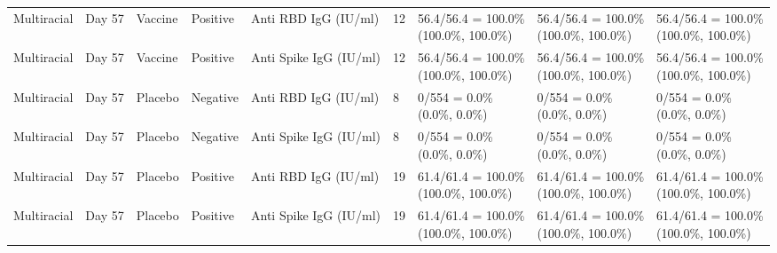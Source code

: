 \documentclass[]{book}
\theoremstyle{definition}
\theoremstyle{definition}
\theoremstyle{definition}
\newcommand{\1}{\mathbbm{1}}
\begin{document}
\begin{landscape}
\begin{ThreePartTable}
\begin{longtable}[t]{>{\raggedright\arraybackslash}p{2.7cm}llllllll}
\hspace{1em}Multiracial & Day 57 & Vaccine & Positive & Anti RBD IgG (IU/ml) & 12 & \makecell[l]{56.4/56.4 = 100.0\%\\(100.0\%, 100.0\%)} & \makecell[l]{56.4/56.4 = 100.0\%\\(100.0\%, 100.0\%)} & \makecell[l]{56.4/56.4 = 100.0\%\\(100.0\%, 100.0\%)}\\
\hspace{1em}Multiracial & Day 57 & Vaccine & Positive & Anti Spike IgG (IU/ml) & 12 & \makecell[l]{56.4/56.4 = 100.0\%\\(100.0\%, 100.0\%)} & \makecell[l]{56.4/56.4 = 100.0\%\\(100.0\%, 100.0\%)} & \makecell[l]{56.4/56.4 = 100.0\%\\(100.0\%, 100.0\%)}\\
\hspace{1em}Multiracial & Day 57 & Placebo & Negative & Anti RBD IgG (IU/ml) & 8 & \makecell[l]{0/554 = 0.0\%\\(0.0\%, 0.0\%)} & \makecell[l]{0/554 = 0.0\%\\(0.0\%, 0.0\%)} & \makecell[l]{0/554 = 0.0\%\\(0.0\%, 0.0\%)}\\
\hspace{1em}Multiracial & Day 57 & Placebo & Negative & Anti Spike IgG (IU/ml) & 8 & \makecell[l]{0/554 = 0.0\%\\(0.0\%, 0.0\%)} & \makecell[l]{0/554 = 0.0\%\\(0.0\%, 0.0\%)} & \makecell[l]{0/554 = 0.0\%\\(0.0\%, 0.0\%)}\\
\hspace{1em}Multiracial & Day 57 & Placebo & Positive & Anti RBD IgG (IU/ml) & 19 & \makecell[l]{61.4/61.4 = 100.0\%\\(100.0\%, 100.0\%)} & \makecell[l]{61.4/61.4 = 100.0\%\\(100.0\%, 100.0\%)} & \makecell[l]{61.4/61.4 = 100.0\%\\(100.0\%, 100.0\%)}\\
\hspace{1em}Multiracial & Day 57 & Placebo & Positive & Anti Spike IgG (IU/ml) & 19 & \makecell[l]{61.4/61.4 = 100.0\%\\(100.0\%, 100.0\%)} & \makecell[l]{61.4/61.4 = 100.0\%\\(100.0\%, 100.0\%)} & \makecell[l]{61.4/61.4 = 100.0\%\\(100.0\%, 100.0\%)}\\

\end{longtable}
\end{ThreePartTable}
\end{landscape}
\end{document}
